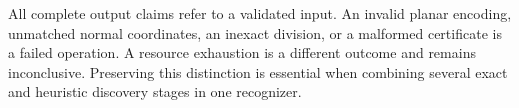 All complete output claims refer to a validated input. An invalid planar
encoding, unmatched normal coordinates, an inexact division, or a malformed
certificate is a failed operation. A resource exhaustion is a different
outcome and remains inconclusive. Preserving this distinction is essential
when combining several exact and heuristic discovery stages in one
recognizer.
